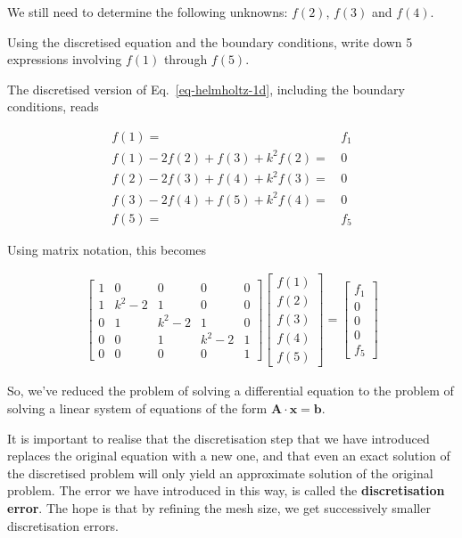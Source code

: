 We still need to determine the following unknowns: $f(2)$, $f(3)$ and $f(4)$.


\begin{cue}
Using the discretised equation and the boundary conditions, write down 5 expressions involving $f(1)$ through $f(5)$.
\end{cue}

The discretised version of Eq.~\ref{eq-helmholtz-1d}, including the boundary conditions, reads

\begin{align}
f(1)=& \, f_1 \\
f(1) -2f(2) + f(3) + k^2 f(2) =& \, 0 \\
f(2) -2f(3) + f(4) + k^2 f(3) =& \, 0\\
f(3) -2f(4) + f(5) + k^2 f(4) =& \, 0\\
f(5)=& \, f_5
\end{align} 

Using matrix notation, this becomes

\begin{gather}
\begin{bmatrix}
1& 0& 0& 0& 0 \\
1& k^2-2& 1& 0& 0 \\
0& 1& k^2-2& 1& 0  \\
0& 0& 1& k^2-2& 1  \\
0& 0& 0& 0& 1
\end{bmatrix}
\begin{bmatrix}
f(1) \\
f(2) \\
f(3) \\
f(4) \\
f(5)
\end{bmatrix}
= 
\begin{bmatrix}
f_1 \\
0 \\
0 \\
0 \\
f_5
\end{bmatrix} \label{eq-ex-fd}
\end{gather}

So, we've reduced the problem of solving a differential equation to the problem of solving a linear system of equations of the form ${\mathbf A}\cdot{\mathbf x}={\mathbf b}$.

It is important to realise that the discretisation step that we have introduced replaces the original equation with a new one, and that even an exact solution of the discretised problem will only yield an approximate solution of the original problem. The error we have introduced in this way, is called the \textbf{discretisation error}. The hope is that by refining the mesh size, we get successively smaller discretisation errors. 


